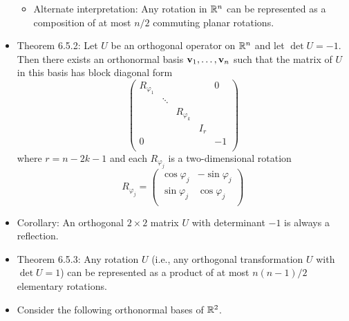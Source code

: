 \documentclass[../../notes.tex]{subfiles}
\begin{document}
\begin{itemize}
\begin{itemize}
        \item Alternate interpretation: Any rotation in $\mathbb{R}^n$ can be represented as a composition of at most $n/2$ commuting planar rotations.
    \end{itemize}
    \item Theorem 6.5.2: Let $U$ be an orthogonal operator on $\mathbb{R}^n$ and let $\det U=-1$. Then there exists an orthonormal basis $\mathbf{v}_1,\dots,\mathbf{v}_n$ such that the matrix of $U$ in this basis has block diagonal form
    \begin{equation*}
        \begin{pmatrix}
            R_{\varphi_1} &  &  &  & 0\\
             & \ddots &  &  & \\
             &  & R_{\varphi_k} &  & \\
             &  &  & I_r & \\
            0 &  &  &  & -1\\
        \end{pmatrix}
    \end{equation*}
    where $r=n-2k-1$ and each $R_{\varphi_j}$ is a two-dimensional rotation
    \begin{equation*}
        R_{\varphi_j} =
        \begin{pmatrix}
            \cos\varphi_j & -\sin\varphi_j\\
            \sin\varphi_j & \cos\varphi_j\\
        \end{pmatrix}
    \end{equation*}
    \item Corollary: An orthogonal $2\times 2$ matrix $U$ with determinant $-1$ is always a reflection.
    \item Theorem 6.5.3: Any rotation $U$ (i.e., any orthogonal transformation $U$ with $\det U=1$) can be represented as a product of at most $n(n-1)/2$ elementary rotations.
    \item Consider the following orthonormal bases of $\mathbb{R}^2$.
    \begin{figure}[h!]
        \centering
        \begin{subfigure}[b]{0.3\linewidth}
            \centering
            \caption{}
            \label{fig:orientationR2a}

\end{subfigure}
\end{figure}
\end{itemize}
\end{document}
